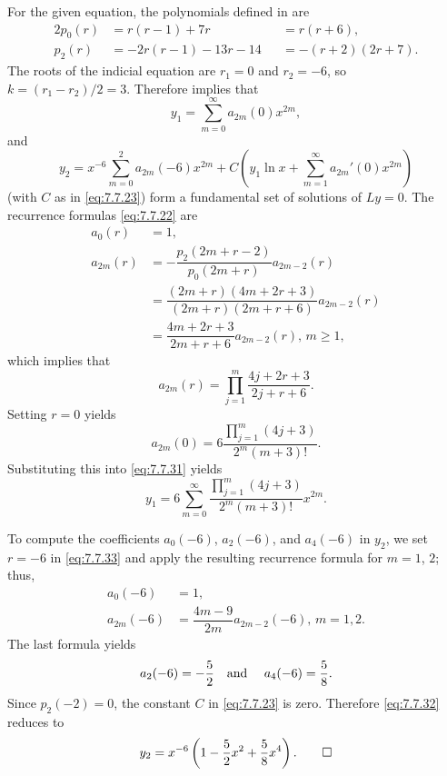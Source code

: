 \begin{solution}
For  the given equation, the polynomials defined in
 are
\begin{alignat*}{2}
p_0(r)&=r(r-1)+7r&&=r(r+6),\\
p_2(r)&=-2r(r-1)-13r-14&&=-(r+2)(2r+7).
\end{alignat*}
The roots of the indicial equation are $r_1=0$ and $r_2=-6$,
so $k=(r_1-r_2)/2=3$. Therefore  implies that
\begin{equation} \label{eq:7.7.31}
y_1=\sum_{m=0}^\infty a_{2m}(0)x^{2m},
\end{equation}
and
\begin{equation} \label{eq:7.7.32}
y_2=x^{-6}\sum_{m=0}^2a_{2m}(-6)x^{2m}+C\left(y_1\ln
x+\sum_{m=1}^\infty a_{2m}'(0)x^{2m}\right)
\end{equation}
(with $C$ as in \eqref{eq:7.7.23})
form a fundamental set of
solutions of $Ly=0$. The recurrence formulas \eqref{eq:7.7.22} are
\begin{equation} \label{eq:7.7.33}
\begin{aligned}
a_0(r)&=1,\\
a_{2m}(r)&=-\dfrac{p_2(2m+r-2)}{p_0(2m+r)}a_{2m-2}(r)\\
&=\dfrac{(2m+r)(4m+2r+3)}{(2m+r)(2m+r+6)}a_{2m-2}(r)\\
&=\dfrac{4m+2r+3}{2m+r+6}a_{2m-2}(r),\,m\ge1,
\end{aligned}
\end{equation}
which implies that
\[
a_{2m}(r)=\prod_{j=1}^m\frac{4j+2r+3}{2j+r+6}.
\]
Setting $r=0$  yields
\[
a_{2m}(0)=6\frac{\prod_{j=1}^m(4j+3)}{2^m(m+3)!}.
\]
Substituting this into \eqref{eq:7.7.31} yields
\[
y_1=6\sum_{m=0}^\infty\frac{\prod_{j=1}^m(4j+3)}{2^m(m+3)!}x^{2m}.
\]

To compute the coefficients $a_0(-6)$, $a_2(-6)$, and $a_4(-6)$ in
$y_2$, we
set $r=-6$ in \eqref{eq:7.7.33} and apply the resulting recurrence
formula for $m=1$, $2$;   thus,
\begin{align*}
a_0(-6)&=1,\\
a_{2m}(-6)&=\dfrac{4m-9}{2m}a_{2m-2}(-6),\,m=1,2.
\end{align*}
The last formula yields
\[
a_2(-6)=-\frac{5}{2}\text{\quad  and \quad}a_4(-6)=\frac{5}{8}.
\]
Since $p_2(-2)=0$, the constant $C$  in \eqref{eq:7.7.23} is zero.
Therefore \eqref{eq:7.7.32} reduces to
\[
y_2=x^{-6}\left(1-\frac{5}{2}x^2+\frac{5}{8}x^4\right).\qedhere
\]
\end{solution}


